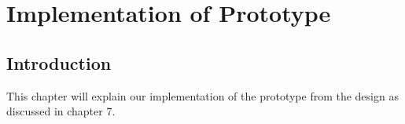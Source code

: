 \chapter{Implementation of Prototype}
\section{Introduction}
This chapter will explain our implementation of the prototype from the design as discussed in chapter 7.


